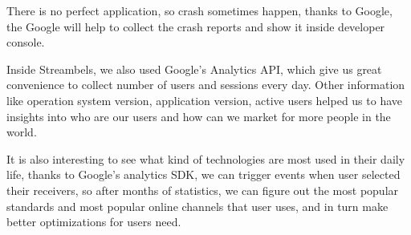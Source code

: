 There is no perfect application, so crash sometimes happen, thanks to Google,
the Google will help to collect the crash reports and show it inside developer
console.

Inside Streambels, we also used Google's Analytics API, which give us
great convenience to collect number of users and sessions every day. Other
information like operation system version, application version, active users
helped us to have insights into who are our users and how can we market for more
people in the world.

It is also interesting to see what kind of technologies are most used in their
daily life, thanks to Google's analytics SDK, we can trigger events when user
selected their receivers, so after months of statistics, we can figure out the
most popular standards and most popular online channels that user uses, and in
turn make better optimizations for users need.


